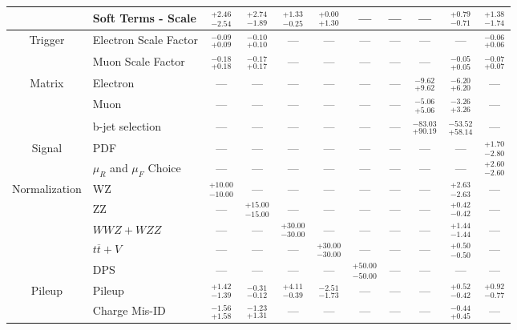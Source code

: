 \begin{tabular}{|cl||ccccccc|c||c|}
\cline{2-11}
&Soft Terms - Scale &  $^{+2.46}_{-2.54}$  &  $^{+2.74}_{-1.89}$  &  $^{+1.33}_{-0.25}$  &  $^{+0.00}_{+1.30}$  & --- & --- & --- &  $^{+0.79}_{-0.71}$  &  $^{+1.38}_{-1.74}$ \\ 
\hline
\multirow{2}{*}{Trigger}
&Electron Scale Factor &  $^{-0.09}_{+0.09}$  &  $^{-0.10}_{+0.10}$  & --- & --- & --- & --- & --- & --- &  $^{-0.06}_{+0.06}$ \\ 
\cline{2-11}
&Muon Scale Factor &  $^{-0.18}_{+0.18}$  &  $^{-0.17}_{+0.17}$  & --- & --- & --- & --- & --- &  $^{-0.05}_{+0.05}$  &  $^{-0.07}_{+0.07}$ \\ 
\hline
\multirow{2}{*}{Matrix}
&Electron & --- & --- & --- & --- & --- & --- &  $^{-9.62}_{+9.62}$  &  $^{-6.20}_{+6.20}$  & ---\\ 
\cline{2-11}
\multirow{2}{*}{Method}
&Muon & --- & --- & --- & --- & --- & --- &  $^{-5.06}_{+5.06}$  &  $^{-3.26}_{+3.26}$  & ---\\ 
\cline{2-11}
&b-jet selection & --- & --- & --- & --- & --- & --- &  $^{-83.03}_{+90.19}$  &  $^{-53.52}_{+58.14}$  & ---\\ 
\hline
\multirow{2}{*}{Signal}
&PDF & --- & --- & --- & --- & --- & --- & --- & --- &  $^{+1.70}_{-2.80}$ \\ 
\cline{2-11}
&$\mu_{R}$ and $\mu_{F}$ Choice & --- & --- & --- & --- & --- & --- & --- & --- &  $^{+2.60}_{-2.60}$ \\ 
\hline
\multirow{5}{*}{Normalization}
&WZ &  $^{+10.00}_{-10.00}$  & --- & --- & --- & --- & --- & --- &  $^{+2.63}_{-2.63}$  & ---\\ 
\cline{2-11}
&ZZ & --- &  $^{+15.00}_{-15.00}$  & --- & --- & --- & --- & --- &  $^{+0.42}_{-0.42}$  & ---\\ 
\cline{2-11}
&$WWZ+WZZ$ & --- & --- &  $^{+30.00}_{-30.00}$  & --- & --- & --- & --- &  $^{+1.44}_{-1.44}$  & ---\\ 
\cline{2-11}
&$t\overline{t}+V$ & --- & --- & --- &  $^{+30.00}_{-30.00}$  & --- & --- & --- &  $^{+0.50}_{-0.50}$  & ---\\ 
\cline{2-11}
&DPS & --- & --- & --- & --- &  $^{+50.00}_{-50.00}$  & --- & --- & --- & ---\\ 
\hline
\multirow{1}{*}{Pileup}
&Pileup &  $^{+1.42}_{-1.39}$  &  $^{-0.31}_{-0.12}$  &  $^{+4.11}_{-0.39}$  &  $^{-2.51}_{-1.73}$  & --- & --- & --- &  $^{+0.52}_{-0.42}$  &  $^{+0.92}_{-0.77}$ \\ 
\hline
&Charge Mis-ID &  $^{-1.56}_{+1.58}$  &  $^{-1.23}_{+1.31}$  & --- & --- & --- & --- & --- &  $^{-0.44}_{+0.45}$  & ---\\ 

\end{tabular}
